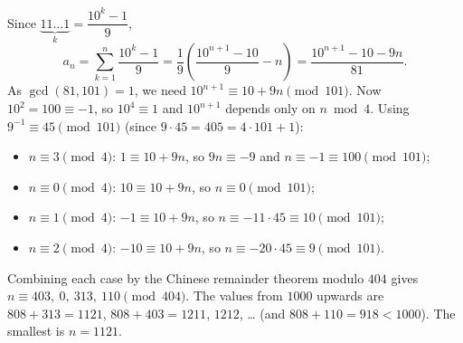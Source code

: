 Since $\underbrace{11\ldots1}_{k}=\dfrac{10^k-1}{9}$,
\[
a_n=\sum_{k=1}^{n}\dfrac{10^k-1}{9}=\dfrac{1}{9}\left(\dfrac{10^{n+1}-10}{9}-n\right)=\dfrac{10^{n+1}-10-9n}{81}.
\]
As $\gcd(81,101)=1$, we need $10^{n+1}\equiv10+9n\pmod{101}$. Now $10^2=100\equiv-1$, so $10^4\equiv1$ and $10^{n+1}$ depends only on $n\bmod4$. Using $9^{-1}\equiv45\pmod{101}$ (since $9\cdot45=405=4\cdot101+1$):
\begin{itemize}
\item $n\equiv3\pmod4$: $1\equiv10+9n$, so $9n\equiv-9$ and $n\equiv-1\equiv100\pmod{101}$;
\item $n\equiv0\pmod4$: $10\equiv10+9n$, so $n\equiv0\pmod{101}$;
\item $n\equiv1\pmod4$: $-1\equiv10+9n$, so $n\equiv-11\cdot45\equiv10\pmod{101}$;
\item $n\equiv2\pmod4$: $-10\equiv10+9n$, so $n\equiv-20\cdot45\equiv9\pmod{101}$.
\end{itemize}
Combining each case by the Chinese remainder theorem modulo $404$ gives $n\equiv403,\ 0,\ 313,\ 110\pmod{404}$. The values from $1000$ upwards are $808+313=1121$, $808+403=1211$, $1212$, \dots{} (and $808+110=918<1000$). The smallest is $n=\boxed{1121}$.
